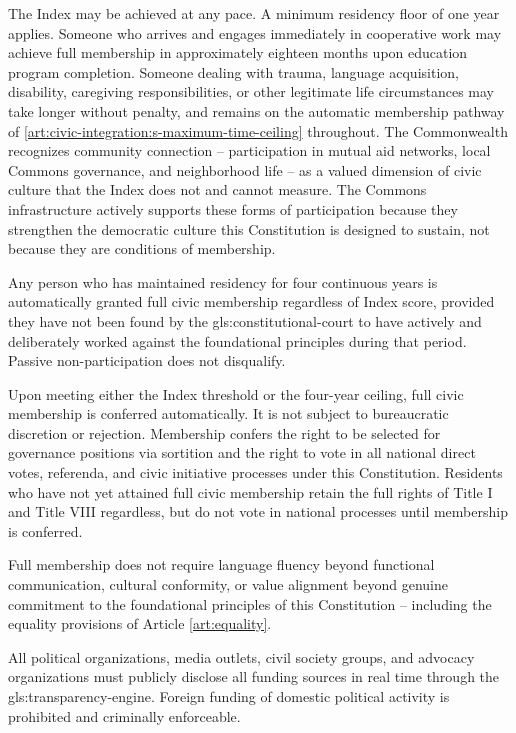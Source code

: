The Index may be achieved at any pace. A minimum residency floor of one year applies. Someone who arrives and engages immediately in cooperative work may achieve full membership in approximately eighteen months upon education program completion. Someone dealing with trauma, language acquisition, disability, caregiving responsibilities, or other legitimate life circumstances may take longer without penalty, and remains on the automatic membership pathway of \ref{art:civic-integration:s-maximum-time-ceiling} throughout. The Commonwealth recognizes community connection -- participation in mutual aid networks, local Commons governance, and neighborhood life -- as a valued dimension of civic culture that the Index does not and cannot measure. The Commons infrastructure actively supports these forms of participation because they strengthen the democratic culture this Constitution is designed to sustain, not because they are conditions of membership.

Any person who has maintained residency for four continuous years is automatically granted full civic membership regardless of Index score, provided they have not been found by the \gls{gls:constitutional-court} to have actively and deliberately worked against the foundational principles during that period. Passive non-participation does not disqualify.

Upon meeting either the Index threshold or the four-year ceiling, full civic membership is conferred automatically. It is not subject to bureaucratic discretion or rejection. Membership confers the right to be selected for governance positions via sortition and the right to vote in all national direct votes, referenda, and civic initiative processes under this Constitution. Residents who have not yet attained full civic membership retain the full rights of Title I and Title VIII regardless, but do not vote in national processes until membership is conferred.

Full membership does not require language fluency beyond functional communication, cultural conformity, or value alignment beyond genuine commitment to the foundational principles of this Constitution -- including the equality provisions of Article \ref{art:equality}.

All political organizations, media outlets, civil society groups, and advocacy organizations must publicly disclose all funding sources in real time through the \gls{gls:transparency-engine}. Foreign funding of domestic political activity is prohibited and criminally enforceable.
